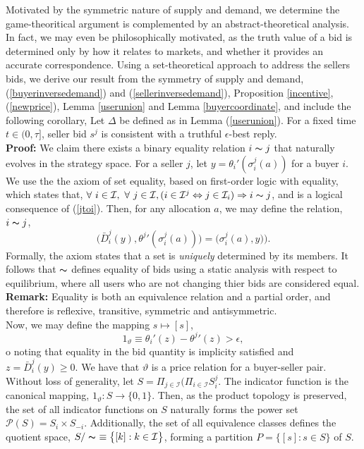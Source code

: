 \documentclass[sigconf, anonymous]{acmart}
\newcommand{\mcI}{\mathcal{I}}
\newcommand{\g}{\sigma}
\theoremstyle{definition}
\begin{document}
Motivated by the symmetric nature of supply and demand, we determine the
game-theoritical argument is complemented by an abstract-theoretical analysis.
In fact, we may even be philosophically motivated, as the truth value of a bid
is determined only by how it relates to markets, and whether it provides an
accurate correspondence. Using a set-theoretical approach to address the sellers
bids, we derive our result from the symmetry of supply and demand,
(\ref{buyerinversedemand}) and (\ref{sellerinversedemand}), Proposition
\ref{incentive}, (\ref{newprice}), Lemma \ref{userunion} and Lemma
\ref{buyercoordinate}, and include the following corollary,
{
Let $\Delta$ be defined as in Lemma (\ref{userunion}).
For a fixed time $t\in (0,\tau]$, seller bid $s^j$ is consistent with a truthful
$\epsilon$-best reply.
}\\
\textbf{Proof:}
We claim there exists a binary equality relation $i\thicksim j$ that naturally evolves in the
strategy space. For a seller $j$, let $y=\theta_i'(\g_i^j(a))$ for a buyer $i$.
We use the the axiom of set equality,
based on first-order logic with equality, which states that,  
$\forall \ i\in\mcI, \ \forall \ j\in\mcI, (i\in \mcI^j \Leftrightarrow j\in\mcI_i)
\Rightarrow i \thicksim j$, and is a logical consequence of (\ref{jtoi}).
Then, for any allocation $a$, we may define the relation, $i\thicksim
j$,
\begin{equation}\label{eqrel}
        \big(\bar{D}_i^j(y), {\theta^j}'(\g_i^j(a))\big) =
        \big(\g_i^j(a),y)\big).
\end{equation}
Formally, the axiom states that a set is \emph{uniquely} determined by its
members. It follows that $\thicksim$ defines equality of bids using a static
analysis with respect to equilibrium, where all users who are not changing thier
bids are considered equal.\\
\textbf{Remark:} Equality is both an equivalence relation and a partial order,
and therefore is reflexive, transitive, symmetric and antisymmetric. \\
Now, we may define the mapping $s \mapsto [s]$,
\begin{equation}\label{indeqrel}
         1_\vartheta \equiv \theta_i'(z) - {\theta^j}'(z) > \epsilon,
\end{equation}o
noting that equality in the bid quantity is implicity satisfied and $z =
\bar{D}_i^j(y)\ge 0$. We have that $\vartheta$ is a price relation for a
buyer-seller pair. Without loss of generality, let $S = \Pi_{j\in\mcI} \big(
\Pi_{i\in\mcI} S_i^j$. The indicator function is the canonical mapping,
$1_\vartheta : S \rightarrow \lbrace{0,1\rbrace}$. Then, as the product
topology is preserved, the set of all indicator
functions on $S$ naturally forms the power set $\mathcal{P}(S) = S_i\times
S_{-i}$. Additionally, the set of all equivalence classes defines the quotient space, $S /
\thicksim \ \equiv \big\lbrace [k] : k\in\mcI \big\rbrace$, forming a partition
$P = \big\lbrace [s] : s\in S\big\rbrace$ of $S$. 
\end{document}
